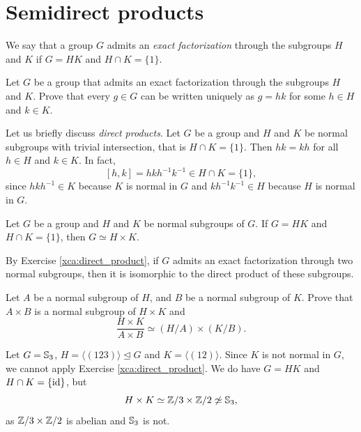 \section{Semidirect products}
\lecture\label{lec:semidirect}

We say that a group $G$ admits an \emph{exact factorization} through 
the subgroups $H$ and $K$ if $G=HK$ and 
$H\cap K=\{1\}$. 

\begin{exercise}
\label{xca:uniqueness}
    Let $G$ be a group that admits an exact factorization through
    the subgroups $H$ and $K$. Prove that every $g\in G$ can be written 
    uniquely as $g=hk$ for some $h\in H$ and $k\in K$. 
\end{exercise}

Let us briefly discuss \emph{direct products}. Let $G$ be a group and $H$ and $K$ be normal subgroups with trivial intersection, that is $H\cap K=\{1\}$. 
Then $hk=kh$ for all $h\in H$ and $k\in K$. In fact, 
\[
[h,k]=hkh^{-1}k^{-1}\in H\cap K=\{1\}, 
\]
since $hkh^{-1}\in K$ because $K$ is normal in $G$ and 
$kh^{-1}k^{-1}\in H$ because $H$ is normal in $G$. 

\begin{exercise}
\label{xca:direct_product}
Let $G$ be a group and $H$ and $K$ be normal subgroups of $G$.
If $G=HK$ and $H\cap K=\{1\}$, then $G\simeq H\times K$.
\end{exercise}

By Exercise \ref{xca:direct_product}, 
if $G$ admits an exact factorization through two normal subgroups, then 
it is isomorphic to the direct product of these subgroups. 

\begin{exercise}
\label{xca:direct_product:quotient}
Let $A$ be a normal subgroup of $H$, and $B$ be a normal subgroup of $K$. 
Prove that $A\times B$ is a normal subgroup of
$H\times K$ and 
\[
\frac{H\times K}{A\times B}\simeq(H/A)\times(K/B).
\]
\end{exercise}

\begin{example}
Let $G=\mathbb{S}_3$, $H=\langle (123)\rangle\unlhd G$ and $K=\langle (12)\rangle$. Since
$K$ is not normal in $G$, we cannot apply Exercise \ref{xca:direct_product}. 
We do have $G=HK$ and $H\cap K=\{\operatorname{id}\}$, but 
\[
H\times K\simeq\mathbb{Z}/3\times\mathbb{Z}/2\not\simeq\mathbb{S}_3,
\]
as $\mathbb{Z}/3\times\mathbb{Z}/2$ is abelian and $\mathbb{S}_3$ is not. 
\end{example}

